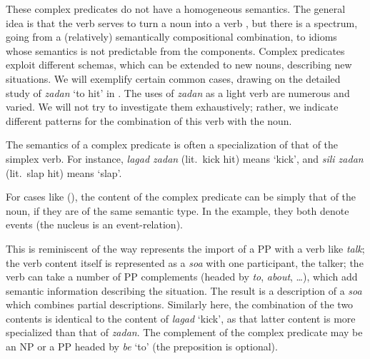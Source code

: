 These complex predicates do not have a homogeneous semantics. The general idea is that the verb serves to turn a noun into a verb \citep{bonami2010persian}, but there is a spectrum, going from a (relatively) semantically compositional combination, to idioms whose semantics is not predictable from the components. Complex predicates exploit different schemas, which can be extended to new nouns, describing new situations. We will exemplify certain common cases, drawing on the detailed study of \emph{zadan} `to hit' in . The uses of \emph{zadan} as a light verb are numerous and varied. We will not try to investigate them exhaustively; rather, we indicate different patterns for the combination of this verb with the noun. 

The semantics of a complex predicate is often a specialization of that of the simplex verb. For instance, \emph{lagad zadan} (lit.\ kick hit) means `kick', and \emph{sili zadan} (lit.\ slap hit) means `slap'. 

\z
\largerpage[2]
For cases like (), the content of the complex predicate can be simply that of the noun, if they are of the
same semantic type. In the example, they both denote events (the nucleus is an event-relation). 

This is reminiscent of the way
\citet{Wechsler1995c} represents the import of a PP with a verb like \emph{talk}; the verb content
itself is represented as a \emph{soa} with one participant, the talker; the verb can take a number
of PP complements (headed by \emph{to}, \emph{about}, \ldots), which add semantic information
describing the situation. The result is a description of a \emph{soa} which combines partial
descriptions. Similarly here, the combination of the two contents is identical to the content of
\emph{lagad} `kick', as that latter content is more specialized than that of \emph{zadan}. The
complement of the complex predicate may be an NP or a PP headed by \emph{be} `to' (the preposition
is optional).


\ea
\label{GSexemple76}
\z

